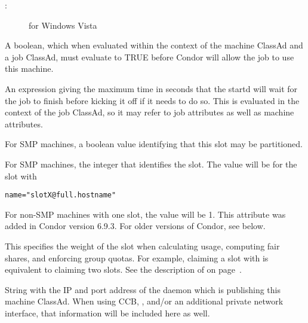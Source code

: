 \begin{description}
\begin{description}
	\item[:] for Windows Vista
	\end{description}
%
\item[\AdAttr{Requirements}:] A boolean, which when evaluated within the context
of the machine ClassAd and a job ClassAd, must evaluate to
TRUE before Condor will allow the job to use this machine.
%
\item[\AdAttr{MaxJobRetirementTime}:] An expression giving the
maximum time in seconds that the startd will wait for the job to
finish before kicking it off if it needs to do so.  This is evaluated
in the context of the job ClassAd, so it may refer to job attributes
as well as machine attributes.
%
\label{PartitionableSlot-machine-attribute} 
\item[\AdAttr{PartitionableSlot}:] For SMP machines,
a boolean value identifying that this slot may be partitioned.
%
\item[\AdAttr{SlotID}:] For SMP machines, the integer
that identifies the slot.
The value will be \verb@X@ for the slot with 
\begin{verbatim}
name="slotX@full.hostname"
\end{verbatim}
For non-SMP machines with one slot, the value will be 1.
\Note This attribute was added in Condor version 6.9.3.
For older versions of Condor, see  below.
%
\item[\AdAttr{SlotWeight}:]
  This specifies the weight of the slot when
  calculating usage, computing fair shares, and enforcing group
  quotas.  For example, claiming a slot with  is
  equivalent to claiming two  slots.
  See the description of  on
  page~\pageref{param:SlotWeight}.

%
\item[\AdAttr{StartdIpAddr}:] String with the IP and port address of the
 daemon which is publishing this machine ClassAd.
When using CCB, , and/or an additional private
network interface, that information will be included here as well.


\end{description}
